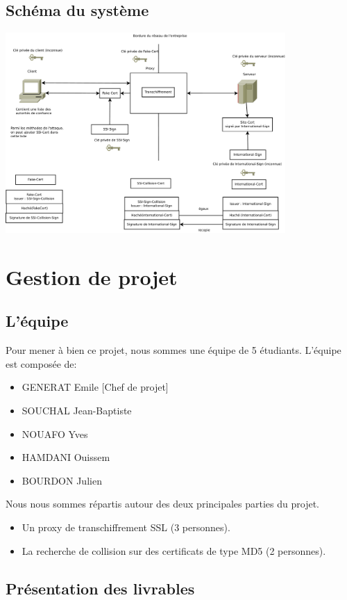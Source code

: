 \documentclass[a4paper,11pt,french]{report}
\begin{document}
\subsection{Schéma du système}
\includegraphics[width=0.8\textwidth]{../../STB/images/schema_autorites.pdf}


\section{Gestion de projet}

\subsection{L'équipe}
Pour mener à bien ce projet, nous sommes une équipe de 5 étudiants. 
L'équipe est composée de:
\begin{itemize}
\item GENERAT Emile [Chef de projet]
\item SOUCHAL Jean-Baptiste
\item NOUAFO Yves
\item HAMDANI Ouissem
\item BOURDON Julien
\end{itemize}
Nous nous sommes répartis autour des deux principales parties du projet.
\begin{itemize}
  \item Un proxy de transchiffrement SSL (3 personnes).
  \item La recherche de collision sur des certificats de type MD5 (2 personnes).

\end{itemize}


\subsection{Présentation des livrables}
\end{document}
